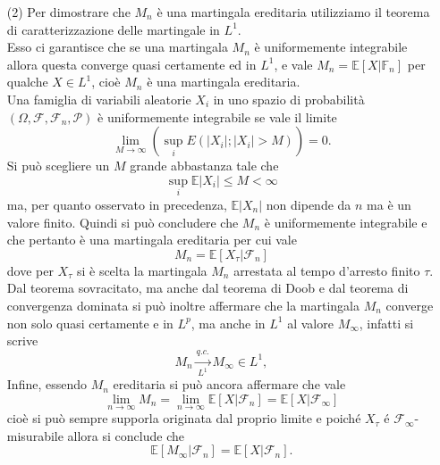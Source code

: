 \documentclass[11pt,largemargins]{homework}
\begin{document}
\begin{enumerate}
\begin{itemize}
   \end{itemize}   
   \item[(2)]
   Per dimostrare che $M_n$ è una martingala ereditaria utilizziamo il teorema di caratterizzazione delle martingale in $L^1$. \\
Esso ci garantisce che se una martingala $M_n$ è uniformemente integrabile allora questa converge quasi certamente ed in $L^1$, e vale $M_n = \mathbb{E} \left[X \lvert \mathbb{F}_n \right]$ per qualche $X \in L^1$, cioè $M_n$ è una martingala ereditaria. \\Una famiglia di variabili aleatorie $X_i$ in uno spazio di probabilità $\left(\Omega, \mathcal{F}, \mathcal{F}_n, \mathcal{P}\right)$ è uniformemente integrabile se vale il limite 
   \[\lim_{M\rightarrow \infty} \left(\sup_i E(\lvert X_i\lvert; \lvert X_i\lvert > M)\right) = 0.\]
Si può scegliere un $M$ grande abbastanza tale che 
\[\sup_i \mathbb{E}\lvert X_i\lvert \leq M < \infty \]
ma, per quanto osservato in precedenza, $\mathbb{E}\lvert X_n \lvert$ non dipende da $n$ ma è un valore finito. Quindi si può concludere che $M_n$ è uniformemente integrabile e che pertanto è una martingala ereditaria per cui vale \[M_n = \mathbb{E}\left[X_\tau |\mathcal{F}_n\right] \] dove per $X_\tau$ si è scelta la martingala $M_n$ arrestata al tempo d'arresto finito $\tau$. \\
Dal teorema sovracitato, ma anche dal teorema di Doob e dal teorema di convergenza dominata si può inoltre affermare che la martingala $M_n$ converge non solo quasi certamente e in $L^p$, ma anche in $L^1$ al valore $M_\infty$, infatti si scrive
   \begin{equation*}
   M_{n}\xrightarrow[L^{1}]{q.c.}M_{\infty}\in L^{1},
   \end{equation*}
Infine, essendo $M_n$ ereditaria si può ancora affermare che vale \[  \lim_{n\to \infty} M_n = \lim_{n\to \infty} \mathbb{E}[X \lvert \mathcal{F}_n] =  \mathbb{E}[X\lvert\mathcal{F}_\infty]\]
cioè si può sempre supporla originata dal proprio limite e poiché $X_\tau$ é $\mathcal{F}_\infty$-misurabile allora si conclude che \[ \mathbb{E}[M_\infty\lvert\mathcal{F}_n] =  \mathbb{E}[X\lvert\mathcal{F}_n].\]
   
   
   
  \end{enumerate}
  
  
  \newpage
\end{document}
